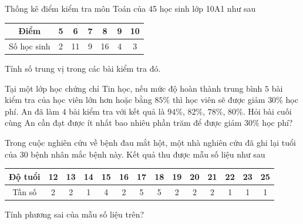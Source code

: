 \begin{bt}%
	Thống kê điểm kiểm tra môn Toán của 45 học sinh lớp 10A1 như sau
	\begin{center}
		\begin{tabular}{|c|c|c|c|c|c|c|}
			\hline
			Điểm&5&6&7&8&9&10\\
			\hline
			Số học sinh&2&11&9&16&4&3\\
			\hline
		\end{tabular}
	\end{center}
	Tính số trung vị trong các bài kiểm tra đó.
\end{bt}

\begin{bt}%
	Tại một lớp học chứng chỉ Tin học, nếu mức độ hoàn thành trung bình $5$ bài kiểm tra của học viên lớn hơn hoặc bằng $85\%$ thì học viên sẽ được giảm $30\%$ học phí. An đã làm $4$ bài kiểm tra với kết quả là $94\%$, $82\%$, $78\%$, $80\%$. Hỏi bài cuối cùng An cần đạt được ít nhất bao nhiêu phần trăm để được giảm $30\%$ học phí?
\end{bt}

\begin{bt}%
	Trong cuộc nghiên cứu về bệnh đau mắt hột, một nhà nghiên cứu đã ghi lại tuổi của $ 30 $ bệnh nhân mắc bệnh này. Kết quả thu được mẫu số liệu như sau
	\begin{center}
		\begin{tabular}{|c|c|c|c|c|c|c|c|c|c|c|c|c|c|}
			\hline
			Độ tuổi & 12 & 13 & 14 & 15 & 16 & 17 & 18 & 19 & 20 & 21 & 22 & 23 & 25 \\
			\hline
			Tần số & 2 & 2 & 1 & 4 & 2 & 5 & 5 & 2 & 2 & 2 & 1 & 1 & 1\\
			\hline		
		\end{tabular}
	\end{center}
	Tính phương sai của mẫu số liệu trên?
\end{bt}


